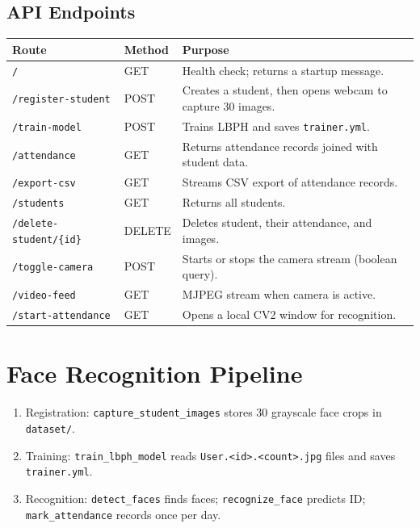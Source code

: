 \documentclass[11pt]{article}
\begin{document}
\subsection*{API Endpoints}
\begin{longtable}{|p{}|p{}|p{}|}
\hline
\textbf{Route} & \textbf{Method} & \textbf{Purpose} \\\hline
\texttt{/} & GET & Health check; returns a startup message. \\\hline
\texttt{/register-student} & POST & Creates a student, then opens webcam to capture 30 images. \\\hline
\texttt{/train-model} & POST & Trains LBPH and saves \texttt{trainer.yml}. \\\hline
\texttt{/attendance} & GET & Returns attendance records joined with student data. \\\hline
\texttt{/export-csv} & GET & Streams CSV export of attendance records. \\\hline
\texttt{/students} & GET & Returns all students. \\\hline
\texttt{/delete-student/\{id\}} & DELETE & Deletes student, their attendance, and images. \\\hline
\texttt{/toggle-camera} & POST & Starts or stops the camera stream (boolean query). \\\hline
\texttt{/video-feed} & GET & MJPEG stream when camera is active. \\\hline
\texttt{/start-attendance} & GET & Opens a local CV2 window for recognition. \\\hline
\end{longtable}

\section*{Face Recognition Pipeline}
\begin{enumerate}[leftmargin=*]
  \item Registration: \texttt{capture\_student\_images} stores 30 grayscale face crops in \texttt{dataset/}.
  \item Training: \texttt{train\_lbph\_model} reads \texttt{User.<id>.<count>.jpg} files and saves \texttt{trainer.yml}.
  \item Recognition: \texttt{detect\_faces} finds faces; \texttt{recognize\_face} predicts ID; \texttt{mark\_attendance} records once per day.
\end{enumerate}
\end{document}
